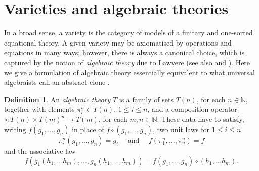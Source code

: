 \documentclass{amsart}
\numberwithin{equation}{section}
\theoremstyle{plain}
\theoremstyle{definition}
\newtheorem{definition}[theorem]{Definition}
\begin{document}
\section{Varieties and algebraic theories}
\label{sec:alg}
In a broad sense, a variety is the category of models of a finitary and one-sorted equational theory. 
A given variety may be axiomatised by operations and equations in many ways; 
however, there is always a canonical choice, which is captured by the notion of \emph{algebraic theory} due to Lawvere \cite{Law63} (see also \cite[Section 3]{B2} and \cite[Chapter 11]{ARV10}). 
Here we give a formulation of algebraic theory essentially equivalent to what universal algebraists call an abstract clone \cite{T93}.

\begin{definition}
  An \emph{algebraic theory} $T$ is a family of sets $T(n)$, for each $n \in \mathbb{N}$, together with elements $\pi^n_i \in T(n)$, $1 \le i \le n$, and 
a composition operator $ \circ : T(n) \times T(m)^n \to T(m)$, for each $m,n \in \mathbb{N}$. 
These data have to satisfy, writing $f(g_1, \ldots, g_n)$ in place of $f \circ (g_1, \ldots, g_n)$, two unit laws for $1 \le i \le n$
\begin{equation}
  \label{eq:c12}
  \pi^n_i(g_1, \ldots, g_n) = g_i \quad \text{ and } \quad  f(\pi^n_1, \ldots, \pi^n_n) = f 
\end{equation}
and the associative law 
\begin{equation}
  \label{eq:c3}
  f(g_1(h_1,\ldots h_m),\ldots,g_n(h_1,\ldots,h_m)) = f(g_1,\ldots,g_n)\circ (h_1,\ldots h_m)\text{.}
\end{equation}
\end{definition}
\end{document}

